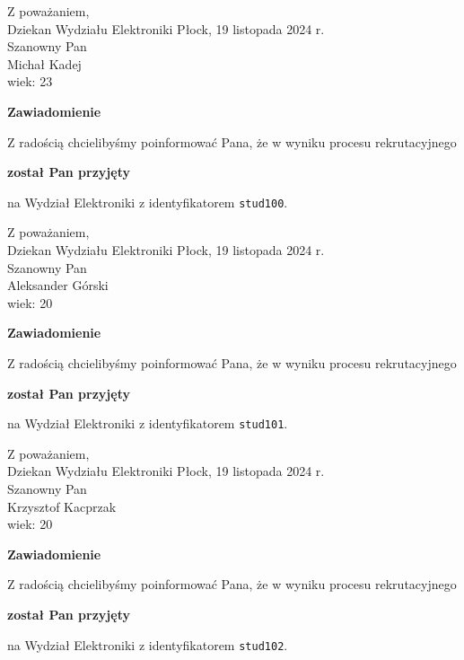 \documentclass[12pt,a4paper]{article}
\begin{document}
\noindent
Z poważaniem,\\
Dziekan
Wydziału Elektroniki
\newpage
\hfill Płock, 19 listopada 2024 r.\\ 
\noindent 
Szanowny Pan \\
Michał Kadej \\
wiek: 23

\bigskip

\begin{center}
{\Large\textbf{Zawiadomienie}}
\end{center}
\bigskip
Z radością chcielibyśmy poinformować Pana, że w wyniku procesu rekrutacyjnego
\begin{center}
\textsf{\textbf{został Pan przyjęty}} 
\end{center}
na Wydział Elektroniki z identyfikatorem \verb|stud100|.
\vspace{2cm}

\noindent
Z poważaniem,\\
Dziekan
Wydziału Elektroniki
\newpage
\hfill Płock, 19 listopada 2024 r.\\ 
\noindent 
Szanowny Pan \\
Aleksander Górski \\
wiek: 20

\bigskip

\begin{center}
{\Large\textbf{Zawiadomienie}}
\end{center}
\bigskip
Z radością chcielibyśmy poinformować Pana, że w wyniku procesu rekrutacyjnego
\begin{center}
\textsf{\textbf{został Pan przyjęty}} 
\end{center}
na Wydział Elektroniki z identyfikatorem \verb|stud101|.
\vspace{2cm}

\noindent
Z poważaniem,\\
Dziekan
Wydziału Elektroniki
\newpage
\hfill Płock, 19 listopada 2024 r.\\ 
\noindent 
Szanowny Pan \\
Krzysztof Kacprzak \\
wiek: 20

\bigskip

\begin{center}
{\Large\textbf{Zawiadomienie}}
\end{center}
\bigskip
Z radością chcielibyśmy poinformować Pana, że w wyniku procesu rekrutacyjnego
\begin{center}
\textsf{\textbf{został Pan przyjęty}} 
\end{center}
na Wydział Elektroniki z identyfikatorem \verb|stud102|.
\vspace{2cm}
\end{document}
